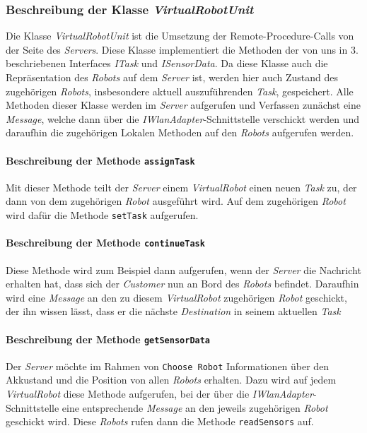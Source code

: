 			
			
	\subsubsection{Beschreibung der Klasse \textit{VirtualRobotUnit}}
	Die Klasse \textit{VirtualRobotUnit} ist die Umsetzung der Remote-Procedure-Calls von der Seite des \textit{Servers}. Diese Klasse implementiert die Methoden der von uns in 3. beschriebenen Interfaces \textit{ITask} und \textit{ISensorData}. Da diese Klasse auch die Repräsentation des \textit{Robots} auf dem \textit{Server} ist, werden hier auch Zustand des zugehörigen \textit{Robots}, insbesondere aktuell auszuführenden \textit{Task}, gespeichert. Alle Methoden dieser Klasse werden im \textit{Server} aufgerufen und Verfassen zunächst eine \textit{Message}, welche dann über die \textit{IWlanAdapter}-Schnittstelle verschickt werden und daraufhin die zugehörigen Lokalen Methoden auf den \textit{Robots} aufgerufen werden.
	
			\paragraph{Beschreibung der Methode \texttt{assignTask}}
			Mit dieser Methode teilt der \textit{Server} einem \textit{VirtualRobot} einen neuen \textit{Task} zu, der dann von dem zugehörigen \textit{Robot} ausgeführt wird. Auf dem zugehörigen \textit{Robot} wird dafür die Methode \texttt{setTask} aufgerufen.
			
			\paragraph{Beschreibung der Methode \texttt{continueTask}}
			Diese Methode wird zum Beispiel dann aufgerufen, wenn der \textit{Server} die Nachricht erhalten hat, dass sich der \textit{Customer} nun an Bord des \textit{Robots} befindet. Daraufhin wird eine \textit{Message} an den zu diesem \textit{VirtualRobot} zugehörigen \textit{Robot} geschickt, der ihn wissen lässt, dass er die nächste \textit{Destination} in seinem aktuellen \textit{Task}			
			
			\paragraph{Beschreibung der Methode \texttt{getSensorData}}
			Der \textit{Server} möchte im Rahmen von \texttt{Choose Robot} Informationen über den Akkustand und die Position von allen \textit{Robots} erhalten. Dazu wird auf jedem \textit{VirtualRobot} diese Methode aufgerufen, bei der über die \textit{IWlanAdapter}-Schnittstelle eine entsprechende \textit{Message} an den jeweils zugehörigen \textit{Robot} geschickt wird. Diese \textit{Robots} rufen dann die Methode \texttt{readSensors} auf.
